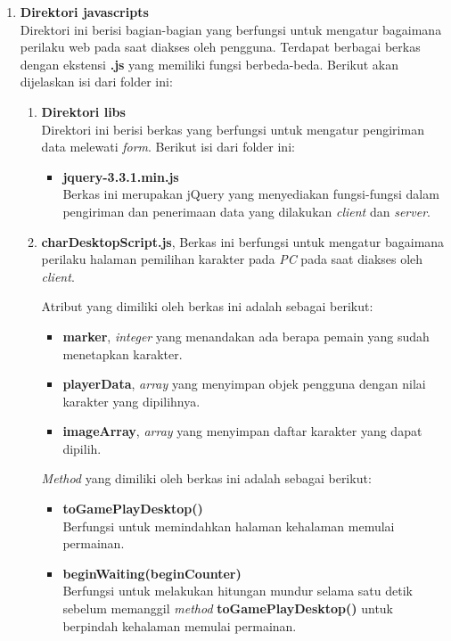 \begin{enumerate}
\begin{enumerate}
		\item \textbf{Direktori javascripts} \\
		Direktori ini berisi bagian-bagian yang berfungsi untuk mengatur bagaimana perilaku web pada saat diakses oleh pengguna. Terdapat berbagai berkas dengan ekstensi \textbf{.js} yang memiliki fungsi berbeda-beda. Berikut akan dijelaskan isi dari folder ini:
		
		\begin{enumerate}
			\item \textbf{Direktori libs} \\
			Direktori ini berisi berkas yang berfungsi untuk mengatur pengiriman data melewati \textit{form}. Berikut isi dari folder ini:
			\begin{itemize}
				\item \textbf{jquery-3.3.1.min.js} \\ Berkas ini merupakan jQuery yang menyediakan fungsi-fungsi dalam pengiriman dan penerimaan data yang dilakukan \textit{client} dan \textit{server}. 
			\end{itemize}
		
			\item \textbf{charDesktopScript.js}, Berkas ini berfungsi untuk mengatur bagaimana perilaku halaman pemilihan karakter pada \textit{PC} pada saat diakses oleh \textit{client}.
			
			Atribut yang dimiliki oleh berkas ini adalah sebagai berikut:
			\begin{itemize}
				\item \textbf{marker}, \textit{integer} yang menandakan ada berapa pemain yang sudah menetapkan karakter.
				\item \textbf{playerData}, \textit{array} yang menyimpan objek pengguna dengan nilai karakter yang dipilihnya.
				\item \textbf{imageArray}, \textit{array} yang menyimpan daftar karakter yang dapat dipilih.
			\end{itemize}
		
			\textit{Method} yang dimiliki oleh berkas ini adalah sebagai berikut:
			\begin{itemize}
				\item \textbf{toGamePlayDesktop()} \\
				Berfungsi untuk memindahkan halaman kehalaman memulai permainan.
				
				\item \textbf{beginWaiting(beginCounter)} \\
				Berfungsi untuk melakukan hitungan mundur selama satu detik sebelum memanggil \textit{method} \textbf{toGamePlayDesktop()} untuk berpindah kehalaman memulai permainan.
			\end{itemize}
		

\end{enumerate}
\end{enumerate}
\end{enumerate}
